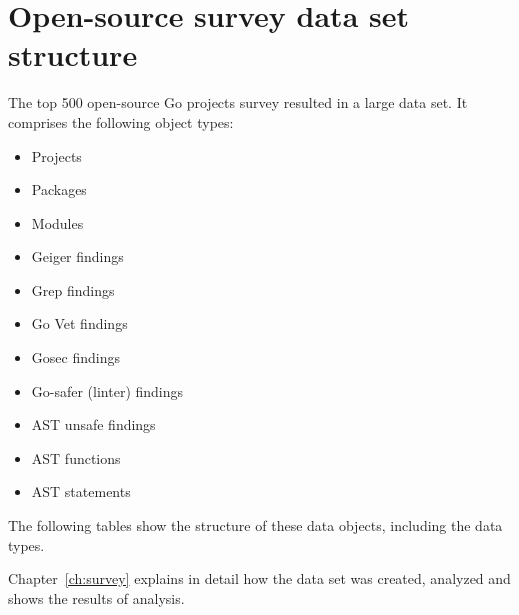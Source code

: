 
\chapter{Open-source survey data set structure}\label{ch:app:data-structure}

The top 500 open-source Go projects survey resulted in a large data set.
It comprises the following object types:

\begin{itemize}
    \item Projects
    \item Packages
    \item Modules
    \item Geiger findings
    \item Grep findings
    \item Go Vet findings
    \item Gosec findings
    \item Go-safer (linter) findings
    \item AST unsafe findings
    \item AST functions
    \item AST statements
\end{itemize}

The following tables show the structure of these data objects, including the data types.

Chapter~\ref{ch:survey} explains in detail how the data set was created, analyzed and shows the results of analysis.

